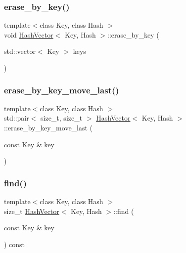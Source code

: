\mbox{\label{class_hash_vector_ac4f12a12ccc7fcfa0535bf411bfe2fb9}} 
\subsubsection{\texorpdfstring{erase\+\_\+by\+\_\+key()}{erase\_by\_key()}\hspace{0.1cm}{\footnotesize\ttfamily [2/2]}}
{\footnotesize\ttfamily template$<$class Key, class Hash $>$ \\
void \mbox{\hyperlink{class_hash_vector}{Hash\+Vector}}$<$ Key, Hash $>$\+::erase\+\_\+by\+\_\+key (\begin{DoxyParamCaption}\item[{std\+::vector$<$ Key $>$}]{keys }\end{DoxyParamCaption})}

\mbox{\label{class_hash_vector_a35f193e747a3005afce49dc6376cfafe}} 
\subsubsection{\texorpdfstring{erase\+\_\+by\+\_\+key\+\_\+move\+\_\+last()}{erase\_by\_key\_move\_last()}}
{\footnotesize\ttfamily template$<$class Key, class Hash $>$ \\
std\+::pair$<$ size\+\_\+t, size\+\_\+t $>$ \mbox{\hyperlink{class_hash_vector}{Hash\+Vector}}$<$ Key, Hash $>$\+::erase\+\_\+by\+\_\+key\+\_\+move\+\_\+last (\begin{DoxyParamCaption}\item[{const Key \&}]{key }\end{DoxyParamCaption})}

\mbox{\label{class_hash_vector_a505bf3ce92bf251105596a8c97b533d3}} 
\subsubsection{\texorpdfstring{find()}{find()}}
{\footnotesize\ttfamily template$<$class Key, class Hash $>$ \\
size\+\_\+t \mbox{\hyperlink{class_hash_vector}{Hash\+Vector}}$<$ Key, Hash $>$\+::find (\begin{DoxyParamCaption}\item[{const Key \&}]{key }\end{DoxyParamCaption}) const}

